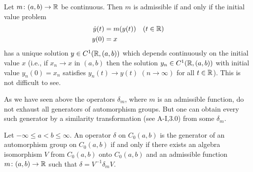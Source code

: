 \begin{remark*}\label{rem:b2-3.24}
Let $m \colon (a,b) \to \mathbb{R}$ be continuous.
Then $m$ is admissible if and only if the initial value problem
\begin{align*}
\dot{y}(t) &= m(y(t)) \quad (t \in \mathbb{R}) \\
y(0) &= x
\end{align*}
has a unique solution $y \in C^{1}(\mathbb{R},(a,b))$ which depends continuously on the initial value $x$ (i.e., if $x_{n} \to x$ in $(a,b)$ then the solution $y_{n} \in C^{1}(\mathbb{R},(a,b))$ with initial value $y_{n}(0) = x_{n}$ satisfies $y_{n}(t) \to y(t)$ $(n \to \infty)$ for all $t \in \mathbb{R}$).
This is not difficult to see.
\end{remark*}
As we have seen above the operators $\delta_{m}$, where $m$ is an admissible function, do not exhaust all generators of automorphism groups.
But one can obtain every such generator by a similarity transformation (see A-I,3.0) from some $\delta_{m}$.
\begin{theorem}\label{thm:b2-3.24}
Let $-\infty \leq a < b \leq \infty$.
An operator $\delta$ on $C_{0}(a,b)$ is the generator of an automorphism group on $C_{0}(a,b)$ if and only if there exists an algebra isomorphism $V$ from $C_{0}(a,b)$ onto $C_{0}(a,b)$ and an admissible function $m \colon (a,b) \to \mathbb{R}$ such that $\delta = V^{-1}\delta_{m}V$.
\end{theorem}
